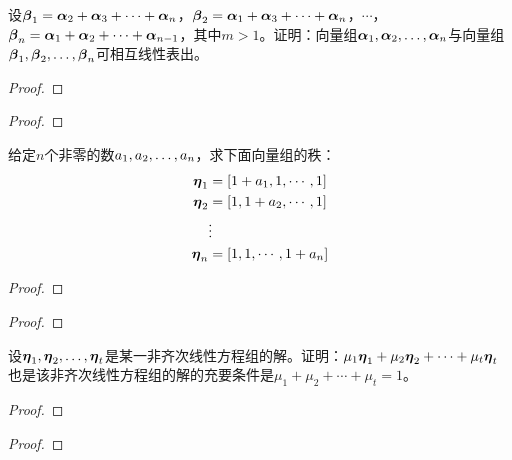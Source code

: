 \begin{problem}
设\(\boldsymbol{\beta}_1=\boldsymbol{\alpha}_2+\boldsymbol{\alpha}_3+\cdots+\boldsymbol{\alpha}_{n}\)，\(\boldsymbol{\beta}_2=\boldsymbol{\alpha}_1+\boldsymbol{\alpha}_3+\cdots+\boldsymbol{\alpha}_{n}\)，\(\cdots\)，\(\boldsymbol{\beta}_n=\boldsymbol{\alpha}_1+\boldsymbol{\alpha}_2+\cdots+\boldsymbol{\alpha}_{n-1}\)，其中\(m>1\)。证明：向量组\({\boldsymbol{\alpha}}_1,{\boldsymbol{\alpha}}_2,\dots,{\boldsymbol{\alpha}}_{n}\)与向量组\({\boldsymbol{\beta}}_1,{\boldsymbol{\beta}}_2,\dots,{\boldsymbol{\beta}}_{n}\)可相互线性表出。
\end{problem}
\begin{proof}

\end{proof}

\begin{problem}

\end{problem}
\begin{proof}

\end{proof}

\begin{problem}
给定\(n\)个非零的数\({a}_1,{a}_2,\dots,{a}_{n}\)，求下面向量组的秩：
\begin{align*}
    \boldsymbol{\eta}_1 & =\left[ 1+a_1,1,\cdots,1 \right] \\
    \boldsymbol{\eta}_2 & =\left[ 1,1+a_2,\cdots,1 \right] \\
              & \vdots                  \\
    \boldsymbol{\eta}_n & =\left[ 1,1,\cdots,1+a_n \right]
\end{align*}
\end{problem}
\begin{proof}

\end{proof}

\begin{problem}

\end{problem}
\begin{proof}

\end{proof}

\begin{problem}
设\({\boldsymbol{\eta}}_1,{\boldsymbol{\eta}}_2,\dots,{\boldsymbol{\eta}}_{t}\)是某一非齐次线性方程组的解。证明：\(\mu_1\boldsymbol{\eta}_1+\mu_2\boldsymbol{\eta}_2+\cdots+\mu_t\boldsymbol{\eta}_t\)也是该非齐次线性方程组的解的充要条件是\(\mu_1+\mu_2+\cdots+\mu_t=1\)。
\end{problem}
\begin{proof}

\end{proof}

\begin{problem}

\end{problem}
\begin{proof}

\end{proof}

